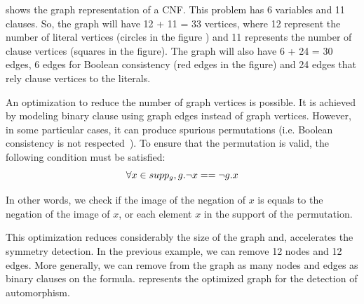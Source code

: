 shows the graph representation of a CNF. This problem has 6 variables and 11
clauses. So, the graph will have  12  + 11 = 33 vertices, where 12 represent the number of literal vertices (circles in the figure ) 
and 11 represents the number of clause vertices (squares in the figure). The graph will also have 6 + 24 = 30 edges, 6 
edges for Boolean consistency (red edges in the figure) and 24 edges that rely clause vertices to the literals.

%
%
%

An optimization to reduce the number of graph vertices is possible. It is achieved by modeling binary clause
using graph edges instead of graph vertices.  However, in some particular cases, it can produce
spurious permutations (i.e. Boolean consistency is not respected~\cite{aloul2003solving}).
To ensure that the permutation is valid, the following condition must be satisfied:
$$\forall x \in supp_g, g.\neg x == \neg g.x$$

In other words, we check if the image of the negation of $x$ is equals to the negation of the image of $x$,
or each element $x$ in the support of the permutation.

This optimization reduces considerably the size of the 
graph and, accelerates the symmetry detection.
In the previous example, we can remove 12 nodes and 12 edges. More generally,
we can remove from the graph as many nodes and edges as binary clauses on the formula.
 represents the optimized graph for the detection of automorphism.

